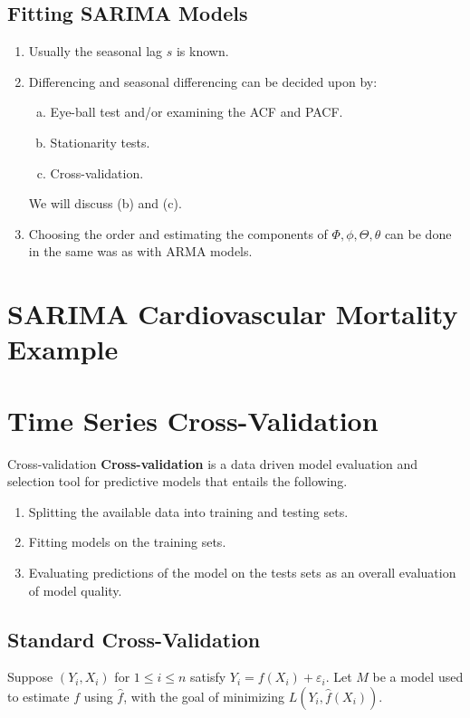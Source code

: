 \subsection*{Fitting SARIMA Models}
\begin{enumerate}[(1)]
    \item Usually the seasonal lag $ s $ is known.
    \item Differencing and seasonal differencing can be decided upon by:
          \begin{enumerate}[(a)]
              \item Eye-ball test and/or examining the ACF and PACF\@.
              \item Stationarity tests.
              \item Cross-validation.
          \end{enumerate}
          {\color{blue}We will discuss (b) and (c).}
    \item Choosing the order and estimating the components of $ \Phi,\phi,\Theta,\theta $
          can be done in the same was as with ARMA models.
\end{enumerate}
\section{SARIMA Cardiovascular Mortality Example}

\section{Time Series Cross-Validation}
\begin{Definition}{Cross-validation}{}
    \textbf{Cross-validation} is a data driven model evaluation
    and selection tool for predictive models that entails the following.
    \begin{enumerate}[(1)]
        \item Splitting the available data into training and testing sets.
        \item Fitting models on the training sets.
        \item Evaluating predictions of the model on the tests sets as an overall
              evaluation of model quality.
    \end{enumerate}
\end{Definition}
\subsection*{Standard Cross-Validation}
Suppose $ (Y_i,X_i) $ for $ 1\le i\le n $ satisfy $ Y_i=f(X_i)+\varepsilon_i $.
Let $ M $ be a model used to estimate $ f $ using $ \hat{f} $,
with the goal of minimizing $ L(Y_i,\hat{f}(X_i)) $.
